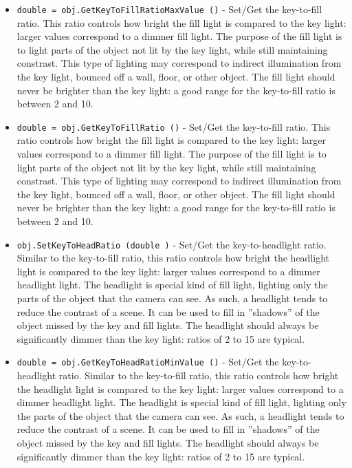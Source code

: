 \begin{itemize}
\item  \verb|double = obj.GetKeyToFillRatioMaxValue ()| -  Set/Get the key-to-fill ratio.  This ratio controls
 how bright the fill light is compared to the key light: larger
 values correspond to a dimmer fill light.  The purpose of the
 fill light is to light parts of the object not lit by the key
 light, while still maintaining constrast.  This type of lighting
 may correspond to indirect illumination from the key light, bounced
 off a wall, floor, or other object.  The fill light should never
 be brighter than the key light:  a good range for the key-to-fill
 ratio is between 2 and 10.

\item  \verb|double = obj.GetKeyToFillRatio ()| -  Set/Get the key-to-fill ratio.  This ratio controls
 how bright the fill light is compared to the key light: larger
 values correspond to a dimmer fill light.  The purpose of the
 fill light is to light parts of the object not lit by the key
 light, while still maintaining constrast.  This type of lighting
 may correspond to indirect illumination from the key light, bounced
 off a wall, floor, or other object.  The fill light should never
 be brighter than the key light:  a good range for the key-to-fill
 ratio is between 2 and 10.

\item  \verb|obj.SetKeyToHeadRatio (double )| -  Set/Get the key-to-headlight ratio.  Similar to the key-to-fill
 ratio, this ratio controls how bright the headlight light is
 compared to the key light: larger values correspond to a dimmer
 headlight light.  The headlight is special kind of fill light,
 lighting only the parts of the object that the camera can see.
 As such, a headlight tends to reduce the contrast of a scene.  It
 can be used to fill in ''shadows'' of the object missed by the key
 and fill lights.  The headlight should always be significantly
 dimmer than the key light:  ratios of 2 to 15 are typical.

\item  \verb|double = obj.GetKeyToHeadRatioMinValue ()| -  Set/Get the key-to-headlight ratio.  Similar to the key-to-fill
 ratio, this ratio controls how bright the headlight light is
 compared to the key light: larger values correspond to a dimmer
 headlight light.  The headlight is special kind of fill light,
 lighting only the parts of the object that the camera can see.
 As such, a headlight tends to reduce the contrast of a scene.  It
 can be used to fill in ''shadows'' of the object missed by the key
 and fill lights.  The headlight should always be significantly
 dimmer than the key light:  ratios of 2 to 15 are typical.


\end{itemize}
